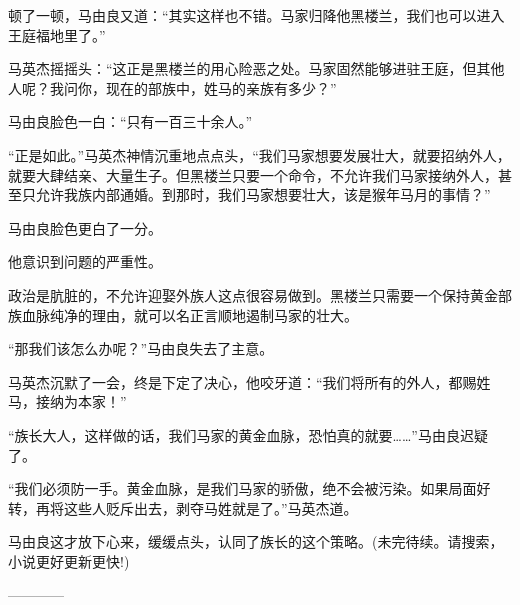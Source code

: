\begin{this_body}
顿了一顿，马由良又道：“其实这样也不错。马家归降他黑楼兰，我们也可以进入王庭福地里了。”

马英杰摇摇头：“这正是黑楼兰的用心险恶之处。马家固然能够进驻王庭，但其他人呢？我问你，现在的部族中，姓马的亲族有多少？”

马由良脸色一白：“只有一百三十余人。”

“正是如此。”马英杰神情沉重地点点头，“我们马家想要发展壮大，就要招纳外人，就要大肆结亲、大量生子。但黑楼兰只要一个命令，不允许我们马家接纳外人，甚至只允许我族内部通婚。到那时，我们马家想要壮大，该是猴年马月的事情？”

马由良脸色更白了一分。

他意识到问题的严重性。

政治是肮脏的，不允许迎娶外族人这点很容易做到。黑楼兰只需要一个保持黄金部族血脉纯净的理由，就可以名正言顺地遏制马家的壮大。

“那我们该怎么办呢？”马由良失去了主意。

马英杰沉默了一会，终是下定了决心，他咬牙道：“我们将所有的外人，都赐姓马，接纳为本家！”

“族长大人，这样做的话，我们马家的黄金血脉，恐怕真的就要……”马由良迟疑了。

“我们必须防一手。黄金血脉，是我们马家的骄傲，绝不会被污染。如果局面好转，再将这些人贬斥出去，剥夺马姓就是了。”马英杰道。

马由良这才放下心来，缓缓点头，认同了族长的这个策略。(未完待续。请搜索，小说更好更新更快!)

------------

\end{this_body}

